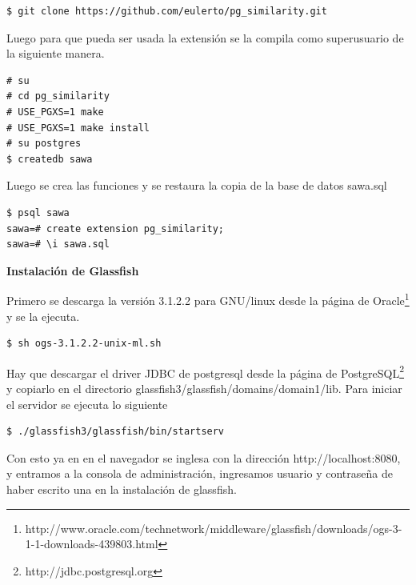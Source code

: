 \begin{lstlisting}
$ git clone https://github.com/eulerto/pg_similarity.git 
\end{lstlisting}

Luego para que pueda ser usada la extensión se la compila como superusuario de la siguiente manera.

\begin{lstlisting}
# su
# cd pg_similarity
# USE_PGXS=1 make
# USE_PGXS=1 make install
# su postgres
$ createdb sawa
\end{lstlisting}

Luego se crea las funciones y se restaura la copia de la base de datos sawa.sql

\begin{lstlisting}
$ psql sawa
sawa=# create extension pg_similarity;
sawa=# \i sawa.sql
\end{lstlisting}

\textbf{Instalación de Glassfish}

Primero se descarga la versión 3.1.2.2 para GNU/linux desde la página de Oracle\footnote{http://www.oracle.com/technetwork/middleware/glassfish/downloads/ogs-3-1-1-downloads-439803.html}
y se la ejecuta.

\begin{lstlisting}
$ sh ogs-3.1.2.2-unix-ml.sh
\end{lstlisting}

Hay que descargar el driver JDBC de postgresql desde la 
página de PostgreSQL\footnote{http://jdbc.postgresql.org} y copiarlo en 
el directorio glassfish3/glassfish/domains/domain1/lib. Para iniciar el servidor 
se ejecuta lo siguiente


\begin{lstlisting}
$ ./glassfish3/glassfish/bin/startserv
\end{lstlisting}

Con esto ya en en el navegador se inglesa con la dirección http://localhost:8080, y
entramos a la consola de administración, ingresamos usuario y contraseña de haber escrito una
en la instalación de glassfish.

